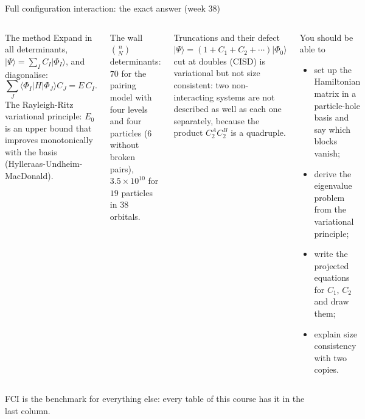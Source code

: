 \documentclass[aspectratio=169,10pt]{beamer}
\newcommand{\ket}[1]{\vert #1\rangle}
\newcommand{\mel}[3]{\langle #1\lvert #2\rvert #3\rangle}
\newcommand{\ph}{\Phi_0}
\begin{document}
\begin{frame}[shrink=1]{Full configuration interaction: the exact answer (week 38)}
\small
\begin{columns}[T]
\begin{block}{The method}
Expand in all determinants, $\ket{\Psi}=\sum_IC_I\ket{\Phi_I}$, and diagonalise:
\[
 \sum_J\mel{\Phi_I}{H}{\Phi_J}C_J=E\,C_I .
\]
The Rayleigh-Ritz variational principle: $E_0$ is an upper bound that improves monotonically with the basis (Hylleraas-Undheim-MacDonald).
\end{block}
\begin{block}{The wall}
$\binom{n}{N}$ determinants: $70$ for the pairing model with four levels and four particles ($6$ without broken pairs), $3.5\times10^{10}$ for $19$ particles in $38$ orbitals.
\end{block}
\begin{block}{Truncations and their defect}
$\ket{\Psi}=(1+C_1+C_2+\cdots)\ket{\ph}$ cut at doubles (CISD) is variational but \alert{not size consistent}: two non-interacting systems are not described as well as each one separately, because the product $C_2^AC_2^B$ is a quadruple.
\end{block}
\begin{block}{You should be able to}
\begin{itemize}
\item set up the Hamiltonian matrix in a particle-hole basis and say which blocks vanish;
\item derive the eigenvalue problem from the variational principle;
\item write the projected equations for $C_1$, $C_2$ and draw them;
\item explain size consistency with two copies.
\end{itemize}
\end{block}
\end{columns}
\vspace{0.3em}
FCI is the benchmark for everything else: every table of this course has it in the last column.
\end{frame}
\end{document}

